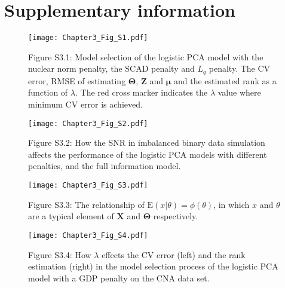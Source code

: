 \clearpage
\section{Supplementary information}
\begin{figure}[htbp]
    \centering
    \texttt{[image: Chapter3\_Fig\_S1.pdf]}
    \caption*{Figure S3.1: Model selection of the logistic PCA model with the nuclear norm penalty, the SCAD penalty and $L_{q}$ penalty. The CV error, RMSE of estimating $\mathbf{\Theta}$, $\mathbf{Z}$ and $\bm{\mu}$ and the estimated rank as a function of $\lambda$. The red cross marker indicates the $\lambda$ value where minimum CV error is achieved.}
    \label{chapter3_fig:S1}
\end{figure}

\begin{figure}[htbp]
    \centering
    \texttt{[image: Chapter3\_Fig\_S2.pdf]}
    \caption*{Figure S3.2: How the SNR in imbalanced binary data simulation affects the performance of the logistic PCA models with different penalties, and the full information model.}
    \label{chapter3_fig:S2}
\end{figure}

\begin{figure}[htbp]
    \centering
    \texttt{[image: Chapter3\_Fig\_S3.pdf]}
    \caption*{Figure S3.3: The relationship of $\text{E}(x|\theta) = \phi(\theta)$, in which $x$ and $\theta$ are a typical element of $\mathbf{X}$ and $\mathbf{\Theta}$ respectively.}
    \label{chapter3_fig:S3}
\end{figure}

\begin{figure}[htbp]
    \centering
    \texttt{[image: Chapter3\_Fig\_S4.pdf]}
    \caption*{Figure S3.4: How $\lambda$ effects the CV error (left) and the rank estimation (right) in the model selection process of the logistic PCA model with a GDP penalty on the CNA data set.}
    \label{chapter3_fig:S4}
\end{figure}









